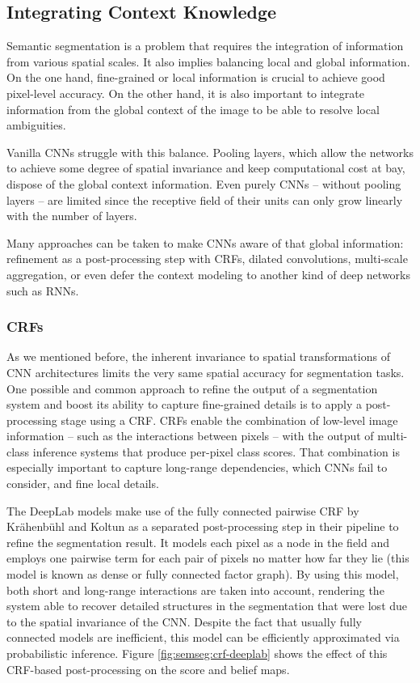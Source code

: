 \subsection{Integrating Context Knowledge}

Semantic segmentation is a problem that requires the integration of information from various spatial scales. It also implies balancing local and global information. On the one hand, fine-grained or local information is crucial to achieve good pixel-level accuracy. On the other hand, it is also important to integrate information from the global context of the image to be able to resolve local ambiguities.

Vanilla \acp{CNN} struggle with this balance. Pooling layers, which allow the networks to achieve some degree of spatial invariance and keep computational cost at bay, dispose of the global context information. Even purely \acp{CNN} -- without pooling layers -- are limited since the receptive field of their units can only grow linearly with the number of layers.

Many approaches can be taken to make \acp{CNN} aware of that global information: refinement as a post-processing step with \acp{CRF}, dilated convolutions, multi-scale aggregation, or even defer the context modeling to another kind of deep networks such as \acp{RNN}.

\subsubsection{\aclp{CRF}}

As we mentioned before, the inherent invariance to spatial transformations of \ac{CNN} architectures limits the very same spatial accuracy for segmentation tasks. One possible and common approach to refine the output of a segmentation system and boost its ability to capture fine-grained details is to apply a post-processing stage using a \acf{CRF}. \acp{CRF} enable the combination of low-level image information -- such as the interactions between pixels \cite{Rother2004}\cite{Shotton2009} -- with the output of multi-class inference systems that produce per-pixel class scores. That combination is especially important to capture long-range dependencies, which \acp{CNN} fail to consider, and fine local details.

The DeepLab models \cite{Chen2014a}\cite{Chen2016} make use of the fully connected pairwise \ac{CRF} by Krähenbühl and Koltun\cite{Koltun2011}\cite{Kraehenbuehl2013} as a separated post-processing step in their pipeline to refine the segmentation result. It models each pixel as a node in the field and employs one pairwise term for each pair of pixels no matter how far they lie (this model is known as dense or fully connected factor graph). By using this model, both short and long-range interactions are taken into account, rendering the system able to recover detailed structures in the segmentation that were lost due to the spatial invariance of the \ac{CNN}. Despite the fact that usually fully connected models are inefficient, this model can be efficiently approximated via probabilistic inference. Figure \ref{fig:semseg:crf-deeplab} shows the effect of this \ac{CRF}-based post-processing on the score and belief maps.

